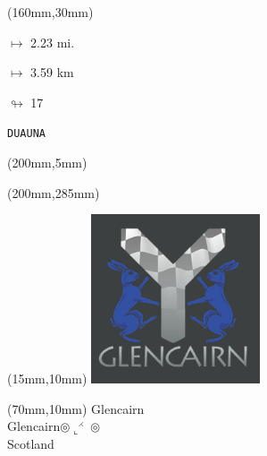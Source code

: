 \begin{textblock*}{40mm}(160mm,30mm)%
\Large
\par$\mapsto$ 2.23 mi.
\par$\mapsto$ 3.59 km
\par$\looparrowright$ 17
\par\hfill\tiny\tt DUAUNA\\
\end{textblock*}
\begin{textblock*}{20mm}(200mm,5mm)%
\fbox{\thepage}
\label{DUAUNA}
\end{textblock*}
\begin{textblock*}{20mm}(200mm,285mm)%
\fbox{\thepage}
\end{textblock*}

\null\newpage
\begin{textblock*}{50mm}(15mm,10mm)%
\includegraphics[width=50mm]{LG/GLCN.png}
\end{textblock*}
\begin{textblock*}{130mm}(70mm,10mm)%
{\fontsize{20}{20}\selectfont Glencairn\\}
{\fontsize{16}{16}\selectfont Glencairn\hfill $\circledcirc\llcorner^{\rightthreetimes}\circledcirc$\\}
{\fontsize{12}{12}\selectfont Scotland\\}
\end{textblock*}
